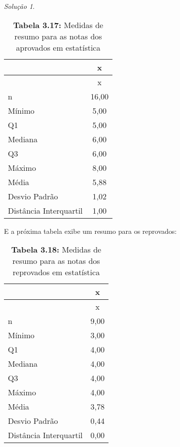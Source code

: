 \documentclass[
]{latex/krantz}
\newenvironment{Shaded}{\begin{snugshade}}{\end{snugshade}}
\newcommand{\AttributeTok}[1]{\textcolor[rgb]{0.13,0.29,0.53}{#1}}
\newcommand{\ConstantTok}[1]{\textcolor[rgb]{0.56,0.35,0.01}{#1}}
\newcommand{\DecValTok}[1]{\textcolor[rgb]{0.00,0.00,0.81}{#1}}
\newcommand{\FunctionTok}[1]{\textcolor[rgb]{0.13,0.29,0.53}{\textbf{#1}}}
\newcommand{\NormalTok}[1]{#1}
\newcommand{\SpecialCharTok}[1]{\textcolor[rgb]{0.81,0.36,0.00}{\textbf{#1}}}
\newcommand{\StringTok}[1]{\textcolor[rgb]{0.31,0.60,0.02}{#1}}
\theoremstyle{definition}
\theoremstyle{definition}
\theoremstyle{definition}
\theoremstyle{definition}
\theoremstyle{remark}
\newtheorem*{solution}{Solução}
\begin{document}
\begin{solution}
\begin{longtable}[]{@{}lc@{}}
\caption{\textbf{Tabela 3.17:} Medidas de resumo para as notas dos aprovados em estatística}\tabularnewline
\toprule\noalign{}
& x \\
\midrule\noalign{}
\endfirsthead
\toprule\noalign{}
& x \\
\midrule\noalign{}
\endhead
\bottomrule\noalign{}
\endlastfoot
n & 16,00 \\
Mínimo & 5,00 \\
Q1 & 5,00 \\
Mediana & 6,00 \\
Q3 & 6,00 \\
Máximo & 8,00 \\
Média & 5,88 \\
Desvio Padrão & 1,02 \\
Distância Interquartil & 1,00 \\
\end{longtable}

E a próxima tabela exibe um resumo para os reprovados:

\begin{Shaded}
\end{Shaded}

\begin{longtable}[]{@{}lc@{}}
\caption{\textbf{Tabela 3.18:} Medidas de resumo para as notas dos reprovados em estatística}\tabularnewline
\toprule\noalign{}
& x \\
\midrule\noalign{}
\endfirsthead
\toprule\noalign{}
& x \\
\midrule\noalign{}
\endhead
\bottomrule\noalign{}
\endlastfoot
n & 9,00 \\
Mínimo & 3,00 \\
Q1 & 4,00 \\
Mediana & 4,00 \\
Q3 & 4,00 \\
Máximo & 4,00 \\
Média & 3,78 \\
Desvio Padrão & 0,44 \\
Distância Interquartil & 0,00 \\
\end{longtable}


\end{solution}
\end{document}
